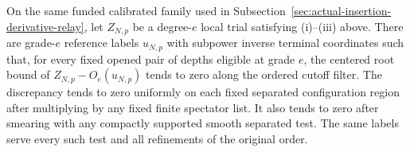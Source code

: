 \begin{proposition}
\label{prop:ope-local-trial-comparison}
On the same funded calibrated family used in
Subsection~\ref{sec:actual-insertion-derivative-relay}, let $Z_{N,p}$
be a degree-$e$ local trial satisfying (i)--(iii) above.
There are grade-$e$ reference labels $u_{N,p}$ with subpower inverse
terminal coordinates such that, for every fixed opened pair of depths
eligible at grade $e$, the centered root bound of
$Z_{N,p}-O_e(u_{N,p})$ tends to zero along the ordered cutoff filter.
The discrepancy tends to zero uniformly on each fixed separated
configuration region after multiplying by any fixed finite spectator
list. It also tends to zero after smearing with any compactly supported
smooth separated test. The same labels serve every such test and all
refinements of the original order.
\end{proposition}
